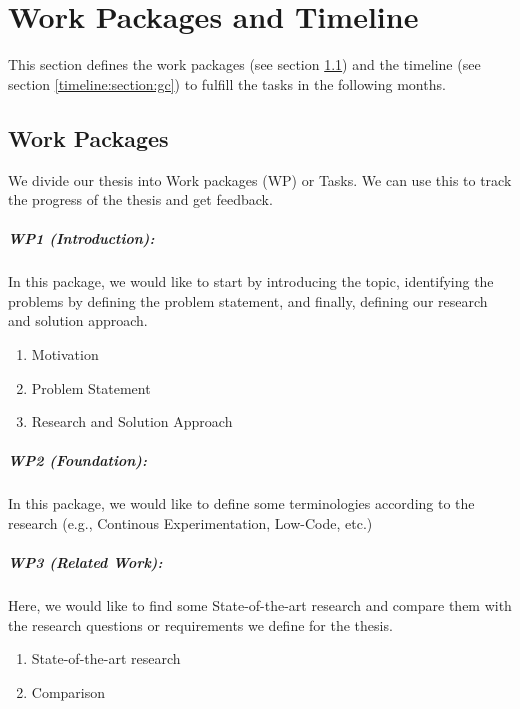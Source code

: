 \chapter{Work Packages and Timeline}
\label{chap:wps}
This section defines the work packages (see section \ref{timeline:section:wp}) and the timeline (see section \ref{timeline:section:gc}) to fulfill the tasks in the following months.

\section{Work Packages}
\label{timeline:section:wp}
We divide our thesis into Work packages (WP) or Tasks.
We can use this to track the progress of the thesis and get feedback.

\paragraph{WP1 (Introduction):} In this package, we would like to start by introducing the topic, identifying the problems by defining the problem statement, and finally, defining our research and solution approach.
\begin{enumerate}
    \item Motivation
    \item Problem Statement
    \item Research and Solution Approach
\end{enumerate}

\paragraph{WP2 (Foundation):} In this package, we would like to define some terminologies according to the research (e.g., Continous Experimentation, Low-Code, etc.)

\paragraph{WP3 (Related Work):} Here, we would like to find some State-of-the-art research and compare them with the research questions or requirements we define for the thesis.
\begin{enumerate}
    \item State-of-the-art research
    \item Comparison
\end{enumerate}


